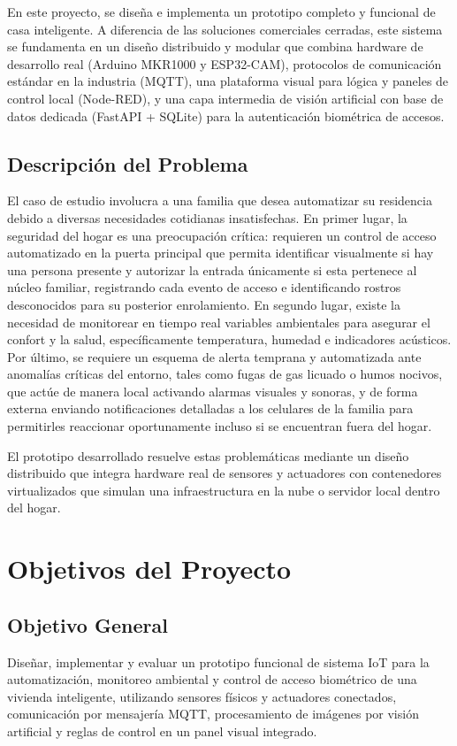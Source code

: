 \documentclass[12pt,letterpaper]{article}
\begin{document}
En este proyecto, se diseña e implementa un prototipo completo y funcional de casa inteligente. A diferencia de las soluciones comerciales cerradas, este sistema se fundamenta en un diseño distribuido y modular que combina hardware de desarrollo real (Arduino MKR1000 y ESP32-CAM), protocolos de comunicación estándar en la industria (MQTT), una plataforma visual para lógica y paneles de control local (Node-RED), y una capa intermedia de visión artificial con base de datos dedicada (FastAPI + SQLite) para la autenticación biométrica de accesos.

\subsection{Descripción del Problema}
El caso de estudio involucra a una familia que desea automatizar su residencia debido a diversas necesidades cotidianas insatisfechas. En primer lugar, la seguridad del hogar es una preocupación crítica: requieren un control de acceso automatizado en la puerta principal que permita identificar visualmente si hay una persona presente y autorizar la entrada únicamente si esta pertenece al núcleo familiar, registrando cada evento de acceso e identificando rostros desconocidos para su posterior enrolamiento. En segundo lugar, existe la necesidad de monitorear en tiempo real variables ambientales para asegurar el confort y la salud, específicamente temperatura, humedad e indicadores acústicos. Por último, se requiere un esquema de alerta temprana y automatizada ante anomalías críticas del entorno, tales como fugas de gas licuado o humos nocivos, que actúe de manera local activando alarmas visuales y sonoras, y de forma externa enviando notificaciones detalladas a los celulares de la familia para permitirles reaccionar oportunamente incluso si se encuentran fuera del hogar.

El prototipo desarrollado resuelve estas problemáticas mediante un diseño distribuido que integra hardware real de sensores y actuadores con contenedores virtualizados que simulan una infraestructura en la nube o servidor local dentro del hogar.

\section{Objetivos del Proyecto}

\subsection{Objetivo General}
Diseñar, implementar y evaluar un prototipo funcional de sistema IoT para la automatización, monitoreo ambiental y control de acceso biométrico de una vivienda inteligente, utilizando sensores físicos y actuadores conectados, comunicación por mensajería MQTT, procesamiento de imágenes por visión artificial y reglas de control en un panel visual integrado.
\end{document}
